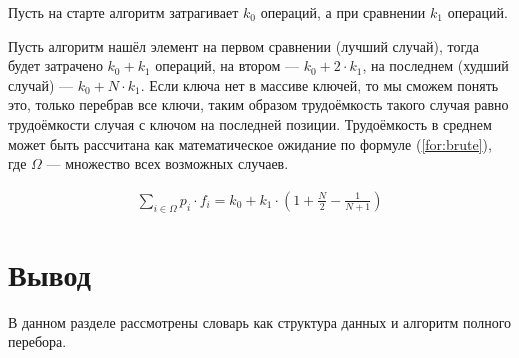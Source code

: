 Пусть на старте алгоритм затрагивает $k_{0}$ операций, а при сравнении $k_{1}$ операций. 

Пусть алгоритм нашёл элемент на первом сравнении (лучший случай), тогда будет затрачено $k_0 + k_1$ операций, на втором --- $k_0 + 2 \cdot k_1$, на последнем (худший случай) --- $k_0 + N \cdot k_1$. Если ключа нет в массиве ключей, то мы сможем понять это, только перебрав все ключи, таким образом трудоёмкость такого случая равно трудоёмкости случая с ключом на последней позиции. Трудоёмкость в среднем может быть рассчитана как математическое ожидание по формуле (\ref{for:brute}), где $\Omega$ --- множество всех возможных случаев.

\begin{equation}
	\label{for:brute}
	\begin{aligned}
		\sum\limits_{i \in \Omega} p_i \cdot f_i = k_0 + k_1 \cdot \left(1 + \frac{N}{2} - \frac{1}{N + 1}\right)
	\end{aligned}
\end{equation}

\section*{Вывод}

В данном разделе рассмотрены словарь как структура данных и алгоритм полного перебора.

